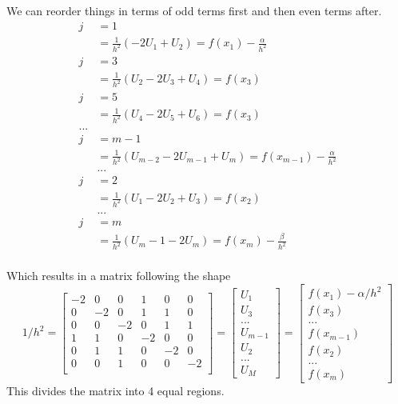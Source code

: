 \documentclass[10pt]{article}
\newcommand{\1}{\mathbb{1}}
\begin{document}
We can reorder things in terms of odd terms first and then even terms after.\\

\begin{align*}
    j &= 1\\
      &= \frac{1}{h^2}(- 2U_1 + U_2) = f(x_1) - \frac{\alpha}{h^2}\\
    j &= 3\\
      &=  \frac{1}{h^2}(U_2 - 2U_3 + U_4) = f(x_3) \\
    j &= 5\\
      &=  \frac{1}{h^2}(U_4 - 2U_5 + U_6) = f(x_3) \\
      ...\\
    j &= m-1\\
      &= \frac{1}{h^2}(U_{m-2} - 2U_{m-1} + U_m) = f(x_{m-1}) - \frac{\alpha}{h^2}\\
      &...\\
    j &= 2\\
      &=  \frac{1}{h^2}(U_1 - 2U_2 + U_3) = f(x_2) \\
      &...\\
    j &= m\\
      &= \frac{1}{h^2}(U_m-1 - 2U_{m}) = f(x_{m}) - \frac{\beta}{h^2}\\
\end{align*}

Which results in a matrix following the shape
\[1/h^2 =
    \begin{bmatrix}
    -2 & 0 & 0 & 1 & 0 & 0\\
    0 & -2 & 0 & 1 & 1 & 0\\
    0 & 0 & -2 & 0 & 1 & 1\\
    1 & 1 & 0 & -2 & 0 & 0\\
    0 & 1 & 1 & 0 & -2 & 0\\
    0 & 0 & 1 & 0 & 0 & -2\\
\end{bmatrix}
=
\begin{bmatrix}
    U_1\\
    U_3\\
    ...\\
    U_{m-1}\\
    U_2\\
    ...\\
    U_M
\end{bmatrix}
=
\begin{bmatrix}
    f(x_1) - \alpha/h^2\\
    f(x_3)\\
    ...\\
    f(x_{m-1})\\
    f(x_2)\\
    ...\\
    f(x_m)
\end{bmatrix}
\]
This divides the matrix into 4 equal regions.\\
\noindent \underline{\hspace{3in}}\\
\end{document}
